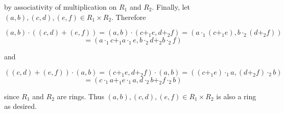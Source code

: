 \begin{solution}
    by associativity of multiplication on $R_1$ and $R_2$. Finally, let
    $(a,b),(c,d),(e,f)\in R_1\times R_2$. Therefore
    
    $$(a,b)\cdot((c,d)+(e,f))=(a,b)\cdot(c+_1e,d+_2f)=(a\cdot_1(c+_1e),b\cdot_2(d+_2f))$$
    $$=(a\cdot_1c+_1a\cdot_1e,b\cdot_2d+_2b\cdot_2f)$$
    
    and
    
    $$((c,d)+(e,f))\cdot(a,b)=(c+_1e,d+_2f)\cdot(a,b)=((c+_1e)\cdot_1a,(d+_2f)\cdot_2b)$$
    $$=(c\cdot_1a+_1e\cdot_1a,d\cdot_2b+_2f\cdot_2b)$$
    
    since $R_1$ and $R_2$ are rings. Thus $(a,b),(c,d),(e,f)\in R_1\times R_2$ is also a ring as
    desired.

\end{solution}